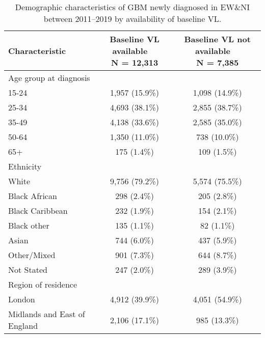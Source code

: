 \begin{table}[!h]
\centering\centering
\caption{\label{tab:vl_demog}Demographic characteristics of GBM newly diagnosed in EW\&NI between 2011--2019 by availability of baseline VL.}
\centering
\begin{tabular}[t]{lcc}
\toprule
\textbf{Characteristic} & \makecell[c]{\textbf{Baseline VL available}\ \ \\N = 12,313} & \makecell[c]{\textbf{Baseline VL not available}\ \ \\N = 7,385}\\
\midrule
Age group at diagnosis &  & \\
\hspace{1em}15-24 & 1,957 (15.9\%) & 1,098 (14.9\%)\\
\hspace{1em}25-34 & 4,693 (38.1\%) & 2,855 (38.7\%)\\
\hspace{1em}35-49 & 4,138 (33.6\%) & 2,585 (35.0\%)\\
\hspace{1em}50-64 & 1,350 (11.0\%) & 738 (10.0\%)\\
\hspace{1em}65+ & 175 (1.4\%) & 109 (1.5\%)\\
Ethnicity &  & \\
\hspace{1em}White & 9,756 (79.2\%) & 5,574 (75.5\%)\\
\hspace{1em}Black African & 298 (2.4\%) & 205 (2.8\%)\\
\hspace{1em}Black Caribbean & 232 (1.9\%) & 154 (2.1\%)\\
\hspace{1em}Black other & 135 (1.1\%) & 82 (1.1\%)\\
\hspace{1em}Asian & 744 (6.0\%) & 437 (5.9\%)\\
\hspace{1em}Other/Mixed & 901 (7.3\%) & 644 (8.7\%)\\
\hspace{1em}Not Stated & 247 (2.0\%) & 289 (3.9\%)\\
Region of residence &  & \\
\hspace{1em}London & 4,912 (39.9\%) & 4,051 (54.9\%)\\
\hspace{1em}Midlands and East of England & 2,106 (17.1\%) & 985 (13.3\%)\\

\end{tabular}
\end{table}
